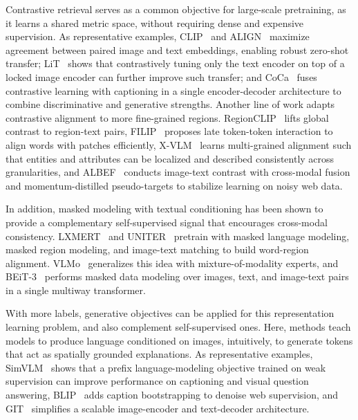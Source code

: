 Contrastive retrieval serves as a common objective for large-scale pretraining, as it learns a shared metric space, without requiring dense and expensive supervision. 
As representative examples, CLIP~\cite{radford2021learning} and ALIGN~\cite{jia2021scaling} maximize agreement between paired image and text embeddings, enabling robust zero-shot transfer; LiT~\cite{zhai2022lit} shows that contrastively tuning only the text encoder on top of a locked image encoder can further improve such transfer; and CoCa~\cite{yu2022coca} fuses contrastive learning with captioning in a single encoder-decoder architecture to combine discriminative and generative strengths. 
Another line of work adapts contrastive alignment to more fine-grained regions. 
RegionCLIP~\cite{zhong2022regionclip} lifts global contrast to region-text pairs, FILIP~\cite{yao2021filip} proposes late token-token interaction to align words with patches efficiently, X-VLM~\cite{zeng2021multi} learns multi-grained alignment such that entities and attributes can be localized and described consistently across granularities, and ALBEF~\cite{li2021align} conducts image-text contrast with cross-modal fusion and momentum-distilled pseudo-targets to stabilize learning on noisy web data. 

In addition, masked modeling with textual conditioning has been shown to provide a complementary self-supervised signal that encourages cross-modal consistency. LXMERT~\cite{tan2019lxmert} and UNITER~\cite{chen2020uniter} pretrain with masked language modeling, masked region modeling, and image-text matching to build word-region alignment.
VLMo~\cite{bao2022vlmo} generalizes this idea with mixture-of-modality experts, and BEiT-3~\cite{wang2023image} performs masked data modeling over images, text, and image-text pairs in a single multiway transformer.

With more labels, generative objectives can be applied for this representation learning problem, and also complement self-supervised ones. 
Here, methods teach models to produce language conditioned on images, intuitively, to generate tokens that act as spatially grounded explanations. 
As representative examples, SimVLM~\cite{wang2021simvlm} shows that a prefix language-modeling objective trained on weak supervision can improve performance on captioning and visual question answering, BLIP~\cite{li2022blip} adds caption bootstrapping to denoise web supervision, and GIT~\cite{wang2022git} simplifies a scalable image-encoder and text-decoder architecture.

